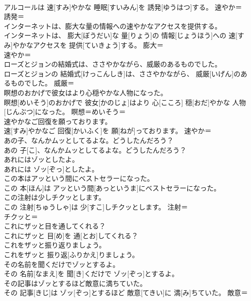 \documentclass[8pt]{extreport}
\begin{document}
\begin{CJK}{UTF8}{min}
\\	アルコールは 速[すみ]やかな 睡眠[すいみん]を 誘発[ゆうはつ]する。	速やか＝ 
\\	誘発＝ 
\\	インターネットは、膨大な量の情報への速やかなアクセスを提供する。	
\\	インターネットは、 膨大[ぼうだい]な 量[りょう]の 情報[じょうほう]への 速[すみ]やかなアクセスを 提供[ていきょう]する。	膨大＝ 
\\	速やか＝ 
\\	ローズとジョンの結婚式は、ささやかながら、威厳のあるものでした。	
\\	ローズとジョンの 結婚式[けっこんしき]は、ささやかながら、 威厳[いげん]のあるものでした。	威厳＝ 
\\	瞑想のおかげで彼女はより心穏やかな人物になった。	
\\	瞑想[めいそう]のおかげで 彼女[かのじょ]はより 心[こころ] 穏[おだ]やかな 人物[じんぶつ]になった。	瞑想＝めいそう＝ 
\\	速やかなご回復を願っております。	
\\	速[すみ]やかなご 回復[かいふく]を 願[ねが]っております。	速やか＝ 
\\	あの子、なんかムッとしてるよな。どうしたんだろう？	
\\	あの 子[こ]、なんかムッとしてるよな。どうしたんだろう？	
\\	あれにはゾッとしたよ。	
\\	あれには ゾッ[ぞっ]としたよ。	
\\	この本はアッという間にベストセラーになった。	
\\	この 本[ほん]は アッという間[あっというま]にベストセラーになった。	
\\	この注射は少しチクッとします。	
\\	この 注射[ちゅうしゃ]は 少[すこ]しチクッとします。	注射＝ 
\\	チクッと＝ 
\\	これにザッと目を通してくれる？	
\\	これにザッと 目[め]を 通[とお]してくれる？	
\\	これをザッと振り返りましょう。	
\\	これをザッと 振り返[ふりかえ]りましょう。	
\\	その名前を聞くだけでゾッとするよ。	
\\	その 名前[なまえ]を 聞[き]くだけで ゾッ[ぞっ]とするよ。	
\\	その記事はゾッとするほど敵意に満ちていた。	
\\	その 記事[きじ]は ゾッ[ぞっ]とするほど 敵意[てきい]に 満[み]ちていた。	敵意＝ 

\end{CJK}
\end{document}
